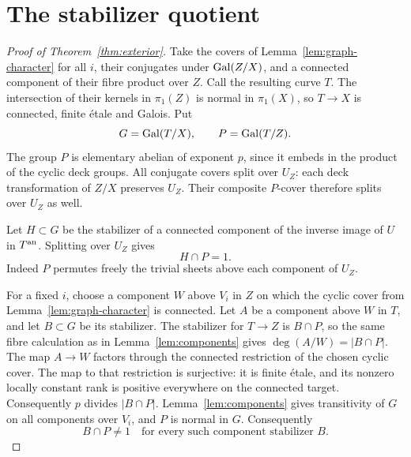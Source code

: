 \section{The stabilizer quotient}

\begin{proof}[Proof of Theorem~\ref{thm:exterior}]
Take the covers of Lemma~\ref{lem:graph-character} for all $i$,
their conjugates under $\operatorname{Gal}(Z/X)$, and a connected component of their
fibre product over $Z$. Call the resulting curve $T$. The intersection
of their kernels in $\pi_1(Z)$ is normal in $\pi_1(X)$, so $T\to X$
is connected, finite \'etale and Galois. Put
\[
 G=\operatorname{Gal}(T/X),\qquad P=\operatorname{Gal}(T/Z).
\]
The group $P$ is elementary abelian of exponent $p$, since it embeds
in the product of the cyclic deck groups. All conjugate covers split
over $U_Z$: each deck transformation of $Z/X$ preserves $U_Z$.
Their composite $P$-cover therefore splits over $U_Z$ as well.

Let $H\subset G$ be the stabilizer of a connected component of the
inverse image of $U$ in $T^{\rm an}$. Splitting over $U_Z$ gives
\begin{equation}\label{eq:disjoint}
                          H\cap P=1.
\end{equation}
Indeed $P$ permutes freely the trivial sheets above each component
of $U_Z$.

For a fixed $i$, choose a component $W$ above $V_i$ in $Z$ on
which the cyclic cover from Lemma~\ref{lem:graph-character} is
connected. Let $A$ be a component above $W$ in $T$, and let
$B\subset G$ be its stabilizer. The stabilizer for $T\to Z$ is
$B\cap P$, so the same fibre calculation as in
Lemma~\ref{lem:components} gives $\deg(A/W)=|B\cap P|$.
The map $A\to W$ factors through the connected restriction of
the chosen cyclic cover. The map to that restriction is surjective:
it is finite \'etale, and its nonzero locally constant rank is
positive everywhere on the connected target. Consequently
$p$ divides $|B\cap P|$.
Lemma~\ref{lem:components} gives transitivity of $G$ on all components
over $V_i$, and $P$ is normal in $G$. Consequently
\begin{equation}\label{eq:nontrivial}
              B\cap P\ne1
 \quad\text{for every such component stabilizer }B.
\end{equation}


\end{proof}
